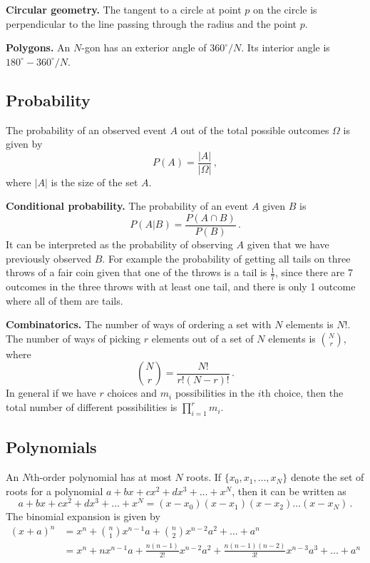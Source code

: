 \documentclass{article}
\begin{document}
\textbf{Circular geometry.} The tangent to a circle at point $p$ on the circle is perpendicular to the line passing through the radius and the point $p$.

\textbf{Polygons.} An $N$-gon has an exterior angle of $360^\circ / N$. Its interior angle is $180^\circ - 360^\circ/N$.

\subsection{Probability}

The probability of an observed event $A$ out of the total possible outcomes $\Omega$ is given by 
\[
P(A)=\frac{|A|}{|\Omega|}\,,
\]
where $|A|$ is the size of the set $A$.

\textbf{Conditional probability.} The probability of an event $A$ given $B$ is
\[
P(A|B)=\frac{P(A\cap B)}{P(B)}\,.
\]
It can be interpreted as the probability of observing $A$ given that we have previously observed $B$. For example the probability of getting all tails on three throws of a fair coin given that one of the throws is a tail is $\frac{1}{7}$, since there are 7 outcomes in the three throws with at least one tail, and there is only 1 outcome where all of them are tails.

\textbf{Combinatorics.} The number of ways of ordering a set with $N$ elements is $N!$. The number of ways of picking $r$ elements out of a set of $N$ elements is $\binom{N}{r}$, where
\[
\binom{N}{r}=\frac{N!}{r!(N-r)!}\,.
\]
In general if we have $r$ choices and $m_i$ possibilities in the $i$th choice, then the total number of different possibilities is $\prod_{i=1}^rm_i$.

\subsection{Polynomials}

An $N$th-order polynomial has at most $N$ roots. If $\{x_0,x_1,\ldots,x_N\}$ denote the set of roots for a polynomial $a+bx+cx^2+dx^3+\ldots+x^N$, then it can be written as
\[
a+bx+cx^2+dx^3+\ldots+x^N = (x-x_0)(x-x_1)(x-x_2)\ldots(x-x_N)\,.
\]
The binomial expansion is given by
\begin{align*}
(x+a)^n &= x^n + \binom{n}{1} x^{n-1} a + \binom{n}{2} x^{n-2} a^2 + \ldots + a^n\\
&= x^n + n x^{n-1}a+\frac{n(n-1)}{2!} x^{n-2}a^2 + \frac{n(n-1)(n-2)}{3!}x^{n-3} a^3 + \ldots + a^n
\end{align*}
\end{document}
